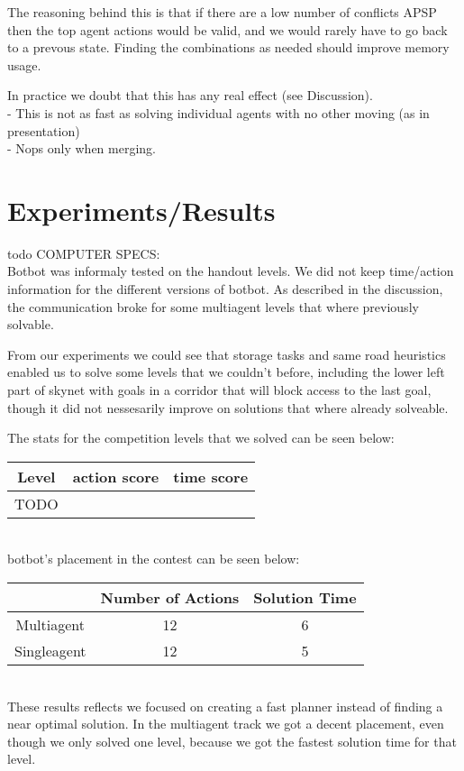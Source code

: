 \documentclass[letterpaper]{article}
\begin{document}
The reasoning behind this is that if there are a low number of conflicts APSP
then the top agent actions would be valid, and we would rarely have to go back
to a prevous state. Finding the combinations as needed should improve memory usage.

In practice we doubt that this has any real effect (see Discussion).\\

- This is not as fast as solving individual agents with no other moving (as in presentation)\\
- Nops only when merging.\\
\section{Experiments/Results}
todo COMPUTER SPECS:\\

Botbot was informaly tested on the handout levels. We did not keep time/action
information for the different versions of botbot. As described in the discussion,
the communication broke for some multiagent levels that where previously solvable.

From our experiments we could see that storage tasks and same road heuristics enabled
us to solve some levels that we couldn't before, including the lower left part of skynet
with goals in a corridor that will block access to the last goal, though it did not
nessesarily improve on solutions that where already solveable.

The stats for the competition levels that we solved can be seen below:\\

\begin{tabular}{c|c|c}
Level & action score & time score \\
\hline
TODO
\end{tabular}\\

botbot's placement in the contest can be seen below:\\

\begin{tabular}{c|c|c}
 & Number of Actions & Solution Time \\
\hline
Multiagent & 12 & 6 \\
Singleagent & 12 & 5 \\
\end{tabular}\\

These results reflects we focused on creating a fast planner instead of finding
a near optimal solution. In the multiagent track we got a decent placement, even
though we only solved one level, because we got the fastest solution time for that level.
\end{document}
